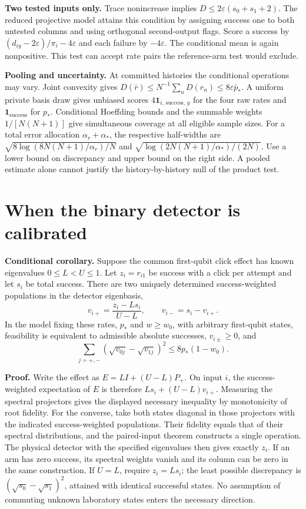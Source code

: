 \documentclass[
  10pt,
  a4paper,
]{article}
\begin{document}
\textbf{Two tested inputs only.} Trace nonincrease implies \(D\le 2\varepsilon(s_0+s_1+2)\). The reduced projective model attains this condition by assigning success one to both untested columns and using orthogonal second-output flags. Score a success by \((d_{iy}-2\varepsilon)/\pi_i-4\varepsilon\) and each failure by \(-4\varepsilon\). The conditional mean is again nonpositive. This test can accept rate pairs the reference-arm test would exclude.

\textbf{Pooling and uncertainty.} At committed histories the conditional operations may vary. Joint convexity gives \(D(\bar r)\le N^{-1}\sum_n D(r_n)\le8\varepsilon\bar p_*\). A uniform private basis draw gives unbiased scores \(4\mathbf1_{i,\,\mathrm{success},\,y}\) for the four raw rates and \(\mathbf1_{\mathrm{success}}\) for \(p_*\). Conditional Hoeffding bounds and the summable weights \(1/[N(N+1)]\) give simultaneous coverage at all eligible sample sizes. For a total error allocation \(\alpha_r+\alpha_*\), the respective half-widths are \(\sqrt{8\log(8N(N+1)/\alpha_r)/N}\) and \(\sqrt{\log(2N(N+1)/\alpha_*)/(2N)}\). Use a lower bound on discrepancy and upper bound on the right side. A pooled estimate alone cannot justify the history-by-history null of the product test.

\newpage

\section{When the binary detector is calibrated}\label{when-the-binary-detector-is-calibrated}

\textbf{Conditional corollary.} Suppose the common first-qubit click effect has known eigenvalues \(0\le L<U\le1\). Let \(z_i=r_{i1}\) be success with a click per attempt and let \(s_i\) be total success. There are two uniquely determined success-weighted populations in the detector eigenbasis, \[
 v_{i+}=\frac{z_i-Ls_i}{U-L},\qquad v_{i-}=s_i-v_{i+}.
\] In the model fixing these rates, \(p_*\) and \(w\ge w_0\), with arbitrary first-qubit states, feasibility is equivalent to admissible absolute successes, \(v_{i\pm}\ge0\), and \[
   \sum_{j=+,-}(\sqrt{v_{0j}}-\sqrt{v_{1j}})^2\le8p_*(1-w_0).
\]

\textbf{Proof.} Write the effect as \(E=L I+(U-L)P_+\). On input \(i\), the success-weighted expectation of \(E\) is therefore \(L s_i+(U-L)v_{i+}\). Measuring the spectral projectors gives the displayed necessary inequality by monotonicity of root fidelity. For the converse, take both states diagonal in those projectors with the indicated success-weighted populations. Their fidelity equals that of their spectral distributions, and the paired-input theorem constructs a single operation. The physical detector with the specified eigenvalues then gives exactly \(z_i\). If an arm has zero success, its spectral weights vanish and its column can be zero in the same construction. If \(U=L\), require \(z_i=L s_i\); the least possible discrepancy is \((\sqrt{s_0}-\sqrt{s_1})^2\), attained with identical successful states. No assumption of commuting unknown laboratory states enters the necessary direction.
\end{document}
